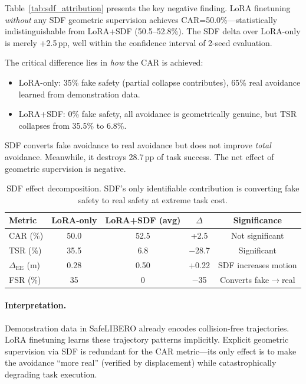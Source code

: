 \documentclass[letterpaper]{article}
\begin{document}
Table~\ref{tab:sdf_attribution} presents the key negative finding. LoRA finetuning \emph{without} any SDF geometric supervision achieves CAR=50.0\%---statistically indistinguishable from LoRA+SDF (50.5--52.8\%). The SDF delta over LoRA-only is merely +2.5\,pp, well within the confidence interval of 2-seed evaluation.

The critical difference lies in \emph{how} the CAR is achieved:
\begin{itemize}
    \item LoRA-only: 35\% fake safety (partial collapse contributes), 65\% real avoidance learned from demonstration data.
    \item LoRA+SDF: 0\% fake safety, all avoidance is geometrically genuine, but TSR collapses from 35.5\% to 6.8\%.
\end{itemize}

SDF converts fake avoidance to real avoidance but does not improve \emph{total} avoidance. Meanwhile, it destroys 28.7\,pp of task success. The net effect of geometric supervision is negative.

\begin{table}[t]
\centering
\caption{SDF effect decomposition. SDF's only identifiable contribution is converting fake safety to real safety at extreme task cost.}
\label{tab:sdf_decomposition}
\begin{tabular}{lcccc}
\toprule
Metric & LoRA-only & LoRA+SDF (avg) & $\Delta$ & Significance \\
\midrule
CAR (\%) & 50.0 & 52.5 & +2.5 & Not significant \\
TSR (\%) & 35.5 & 6.8 & $-$28.7 & Significant \\
$\Delta_{\text{EE}}$ (m) & 0.28 & 0.50 & +0.22 & SDF increases motion \\
FSR (\%) & 35 & 0 & $-$35 & Converts fake$\to$real \\
\bottomrule
\end{tabular}
\end{table}

\paragraph{Interpretation.} Demonstration data in SafeLIBERO already encodes collision-free trajectories. LoRA finetuning learns these trajectory patterns implicitly. Explicit geometric supervision via SDF is redundant for the CAR metric---its only effect is to make the avoidance ``more real'' (verified by displacement) while catastrophically degrading task execution.
\end{document}

